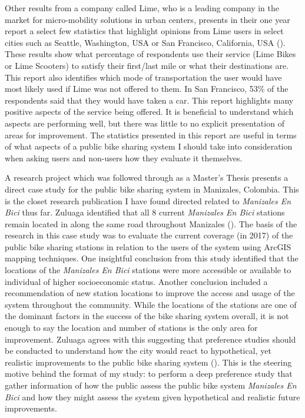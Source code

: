 \documentclass[12pt]{article}
\begin{document}
Other results from a company called Lime, who is a leading company in the market for micro-mobility solutions in urban centers, presents in their one year report a select few statistics that highlight opinions from Lime users in select cities such as Seattle, Washington, USA or San Francisco, California, USA (\cite{LimeBike}). These results show what percentage of respondents use their service (Lime Bikes or Lime Scooters) to satisfy their first/last mile or what their destinations are. This report also identifies which mode of transportation the user would have most likely used if Lime was not offered to them. In San Francisco, 53\% of the respondents said that they would have taken a car. This report highlights many positive aspects of the service being offered. It is beneficial to understand which aspects are performing well, but there was little to no explicit presentation of areas for improvement. The statistics presented in this report are useful in terms of what aspects of a public bike sharing system I should take into consideration when asking users and non-users how they evaluate it themselves. 

A research project which was followed through as a Master's Thesis presents a direct case study for the public bike sharing system in Manizales, Colombia. This is the closet research publication I have found directed related to \textit{Manizales En Bici} thus far. Zuluaga identified that all 8 current \textit{Manizales En Bici} stations remain located in along the same road throughout Manizales (\cite{zuluaga_garcía_2017}). The basis of the research in this case study was to evaluate the current coverage (in 2017) of the public bike sharing stations in relation to the users of the system using ArcGIS mapping techniques. One insightful conclusion from this study identified that the locations of the \textit{Manizales En Bici} stations were more accessible or available to individual of higher socioeconomic status. Another conclusion included a recommendation of new station locations to improve the access and usage of the system throughout the community. While the locations of the stations are one of the dominant factors in the success of the bike sharing system overall, it is not enough to say the location and number of stations is the only area for improvement. Zuluaga agrees with this suggesting that preference studies should be conducted to understand how the city would react to hypothetical, yet realistic improvements to the public bike sharing system (\cite{zuluaga_garcía_2017}). This is the steering motive behind the format of my study: to perform a deep preference study that gather information of how the public assess the public bike system \textit{Manizales En Bici} and how they might assess the system given hypothetical and realistic future improvements. 
\end{document}
